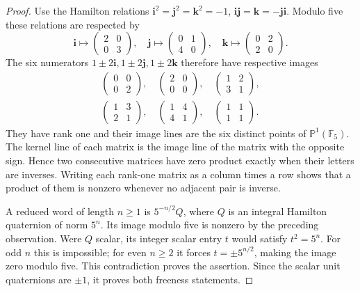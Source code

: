 \begin{proof}
Use the Hamilton relations $\mathbf i^2=\mathbf j^2=\mathbf k^2=-1$,
$\mathbf i\mathbf j=\mathbf k=-\mathbf j\mathbf i$. Modulo five these
relations are respected by
\[
 \mathbf i\mapsto\begin{pmatrix}2&0\\0&3\end{pmatrix},\quad
 \mathbf j\mapsto\begin{pmatrix}0&1\\4&0\end{pmatrix},\quad
 \mathbf k\mapsto\begin{pmatrix}0&2\\2&0\end{pmatrix}.
\]
The six numerators $1\pm2\mathbf i,1\pm2\mathbf j,1\pm2\mathbf k$
therefore have respective images
\begin{equation}\label{eq:sixmatrices58}
 \begin{gathered}
 \begin{pmatrix}0&0\\0&2\end{pmatrix},\quad
 \begin{pmatrix}2&0\\0&0\end{pmatrix},\quad
 \begin{pmatrix}1&2\\3&1\end{pmatrix},\\
 \begin{pmatrix}1&3\\2&1\end{pmatrix},\quad
 \begin{pmatrix}1&4\\4&1\end{pmatrix},\quad
 \begin{pmatrix}1&1\\1&1\end{pmatrix}.
 \end{gathered}
\end{equation}
They have rank one and their image lines are the six distinct points of
$\mathbb P^1(\mathbb F_5)$. The kernel line of each matrix is the image
line of the matrix with the opposite sign. Hence two consecutive
matrices have zero product exactly when their letters are inverses.
Writing each rank-one matrix as a column times a row shows that a product
of them is nonzero whenever no adjacent pair is inverse.

A reduced word of length $n\ge1$ is $5^{-n/2}Q$, where $Q$ is an integral
Hamilton quaternion of norm $5^n$. Its image modulo five is nonzero by
the preceding observation. Were $Q$ scalar, its integer scalar entry $t$
would satisfy $t^2=5^n$. For odd $n$ this is impossible; for even $n\ge2$
it forces $t=\pm5^{n/2}$, making the image zero modulo five. This
contradiction proves the assertion. Since the scalar unit quaternions
are $\pm1$, it proves both freeness statements.
\end{proof}

